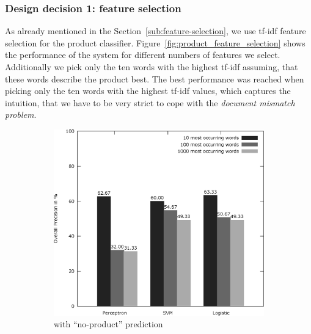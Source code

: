 \subsubsection{Design decision 1: feature selection}
As already mentioned in the Section~\ref{sub:feature-selection}, we use tf-idf feature selection for the product classifier.
Figure~\ref{fig:product_feature_selection} shows the performance of the system for different numbers of features we select.
Additionally we pick only the ten words with the highest tf-idf assuming, that these words describe the product best.
The best performance was reached when picking only the ten words with the highest tf-idf values, which captures the intuition, that we have to be very strict to cope with the \emph{document mismatch problem}.
\begin{figure}[h!]
	\centering
	\begin{subfigure}[t]{0.5\textwidth}
		\includegraphics[width=\textwidth]{figures/product_feature_selection_with_none.eps}
		\caption{with ``no-product'' prediction}
	\end{subfigure}~
	\begin{subfigure}[t]{0.5\textwidth}

\end{subfigure}
\end{figure}
